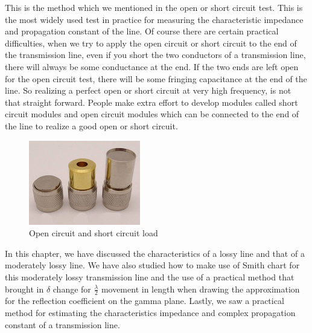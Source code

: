 This is the method which we mentioned in the open or short circuit test. This is the most widely used test in practice for measuring the characteristic impedance and propagation constant of the line. Of course there are certain practical difficulties, when we try to apply the open circuit or short circuit to the end of the transmission line, even if you short the two conductors of a transmission line, there will always be some conductance at the end. If the two ends are left open for the open circuit test, there will be some fringing capacitance at the end of the line. So realizing a perfect open or short circuit at very high frequency, is not that straight forward. People make extra effort to develop modules called short circuit modules and open circuit modules which can be connected to the end of the line to realize a good open or short circuit.
\begin{figure}[h]
\centering
\includegraphics[width=1\linewidth]{"./graphics/Short circuit load"}
\caption{Open circuit and short circuit load}
\end{figure}

In this chapter, we have discussed the characteristics of a lossy line and that of a moderately lossy line. We have also studied how to make use of Smith chart for this moderately lossy transmission line and the use of a practical method that brought in $\delta$ change for $\frac{\lambda}{2}$ movement in length when drawing the approximation for the reflection coefficient on the gamma plane. Lastly, we saw a practical method for estimating the characteristics impedance and complex propagation constant of a transmission line.
